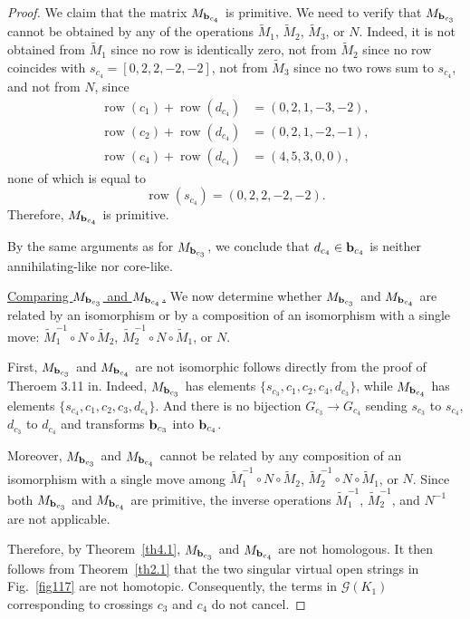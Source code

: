 \documentclass[12pt]{amsart}
\theoremstyle{noparens}
\numberwithin{equation}{section}
\numberwithin{equation}{section}
\begin{document}
\begin{proof}
	We claim that the matrix $M_{{\bf b}_{c_4}}$ is primitive. We need to verify that $M_{{\bf b}_{c_3}}$ cannot be obtained by any of the operations $\widetilde{M}_1$, $\widetilde{M}_2$, $\widetilde{M}_3$, or $N$. Indeed, it is not obtained from $\widetilde{M}_1$ since no row is identically zero, not from $\widetilde{M}_2$ since no row coincides with $s_{c_4} = [0, 2, 2, -2, -2]$, not from $\widetilde{M}_3$ since no two rows sum to $s_{c_4}$, and not from $N$, since
	\[
	\begin{aligned}
		\operatorname{row}(c_1)+\operatorname{row}(d_{c_4})
		&=(0,2,1,-3,-2),\\
		\operatorname{row}(c_2)+\operatorname{row}(d_{c_4})
		&=(0,2,1,-2,-1),\\
		\operatorname{row}(c_4)+\operatorname{row}(d_{c_4})
		&=(4,5,3,0,0),
	\end{aligned}
	\]
	none of which is equal to
	\[
	\operatorname{row}(s_{c_4})=(0,2,2,-2,-2).
	\]
	Therefore, $M_{{\bf b}_{c_4}}$ is primitive.
	
	By the same arguments as for $M_{{\bf b}_{c_3}}$, we conclude that $d_{c_4} \in {\bf b}_{c_4}$ is neither annihilating-like nor core-like.
	
	\underline{Comparing $M_{{\bf b}_{c_3}}$ and $M_{{\bf b}_{c_4}}$.}
	We now determine whether $M_{{\bf b}_{c_3}}$ and $M_{{\bf b}_{c_4}}$ are related by an isomorphism or by a composition of an isomorphism with a single move: $\widetilde{M}_1^{-1} \circ N \circ \widetilde{M}_2$, $\widetilde{M}_2^{-1} \circ N \circ \widetilde{M}_1$, or $N$.
	
	First, $M_{{\bf b}_{c_3}}$ and $M_{{\bf b}_{c_4}}$ are not isomorphic follows directly from the proof of Theroem 3.11 in\cite{Hen}. Indeed, $M_{{\bf b}_{c_3}}$ has elements $\{s_{c_3},c_1,c_2,c_4,d_{c_3}\}$, while $M_{{\bf b}_{c_4}}$ has elements $\{s_{c_4},c_1,c_2,c_3,d_{c_4}\}$. And there is no bijection $G_{c_3} \to G_{c_4}$ sending $s_{c_3}$ to $s_{c_4}$, $d_{c_3}$ to $d_{c_4}$ and transforms ${\bf b}_{c_3}$ into ${\bf b}_{c_4}$.
	
	Moreover, $M_{{\bf b}_{c_3}}$ and $M_{{\bf b}_{c_4}}$ cannot be related by any composition of an isomorphism with a single move among $\widetilde{M}_1^{-1} \circ N \circ \widetilde{M}_2$, $\widetilde{M}_2^{-1} \circ N \circ \widetilde{M}_1$, or $N$. Since both $M_{{\bf b}_{c_3}}$ and $M_{{\bf b}_{c_4}}$ are primitive, the inverse operations $\widetilde{M}_1^{-1}$, $\widetilde{M}_2^{-1}$, and $N^{-1}$ are not applicable.
	
	Therefore, by Theorem~\ref{th4.1}, $M_{{\bf b}_{c_3}}$ and $M_{{\bf b}_{c_4}}$ are not homologous. It then follows from Theorem~\ref{th2.1} that the two singular virtual open strings in Fig.~\ref{fig117} are not homotopic. Consequently, the terms in $\mathcal{G}(K_1)$ corresponding to crossings $c_3$ and $c_4$ do not cancel.
	

\end{proof}
\end{document}
